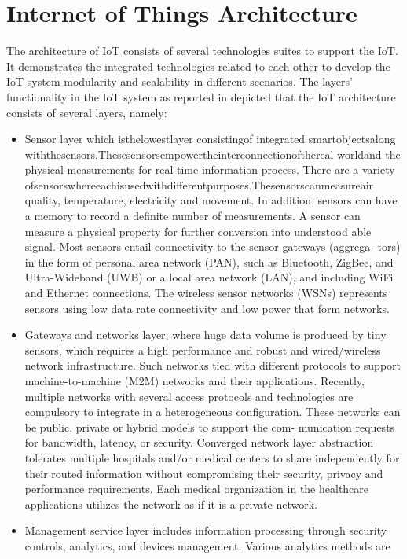 \section{Internet of Things Architecture}
The architecture of IoT consists of several technologies suites to support the IoT. It
demonstrates the integrated technologies related to each other to develop the IoT
system modularity and scalability in different scenarios. The layers’ functionality in
the IoT system as reported in depicted that the IoT architecture consists of
several layers, namely:
\begin{itemize}
\item   Sensor layer which isthelowestlayer consistingof integrated smartobjectsalong
withthesensors.Thesesensorsempowertheinterconnectionofthereal-worldand
the physical measurements for real-time information process. There are a variety
ofsensorswhereeachisusedwithdifferentpurposes.Thesensorscanmeasureair
quality, temperature, electricity and movement. In addition, sensors can have a
memory to record a definite number of measurements.
A sensor can measure a physical property for further conversion into understood
able signal. Most sensors entail connectivity to the sensor gateways (aggrega-
tors) in the form of personal area network (PAN), such as Bluetooth, ZigBee,
and Ultra-Wideband (UWB) or a local area network (LAN), and including WiFi
and Ethernet connections. The wireless sensor networks (WSNs) represents
sensors using low data rate connectivity and low power that form networks.
\item   Gateways and networks layer, where huge data volume is produced by tiny
sensors, which requires a high performance and robust and wired/wireless
network infrastructure. Such networks tied with different protocols to support
machine-to-machine (M2M) networks and their applications. Recently, multiple
networks with several access protocols and technologies are compulsory to
integrate in a heterogeneous configuration.
These networks can be public, private or hybrid models to support the com-
munication requests for bandwidth, latency, or security. Converged network
layer abstraction tolerates multiple hospitals and/or medical centers to share
independently for their routed information without compromising their security,
privacy and performance requirements. Each medical organization in the
healthcare applications utilizes the network as if it is a private network.
\item   Management service layer includes information processing through security
controls, analytics, and devices management. Various analytics methods are

\end{itemize}
